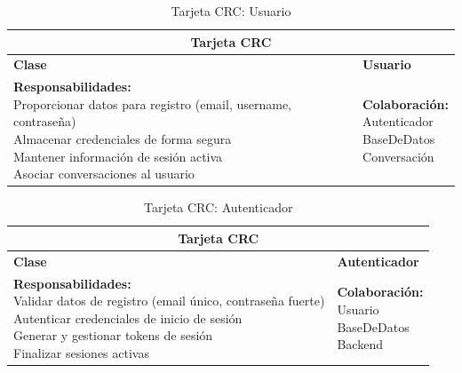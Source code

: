 \begin{addendum}
		\begin{longtable}{|l|l|}
			\caption{Tarjeta CRC: Usuario} \label{tablacrc6} \\
			\hline
			\multicolumn{2}{|c|}{\textbf{Tarjeta CRC}} \\
			\hline
			\textbf{Clase} & \textbf{Usuario} \\
			\hline
			\parbox[t]{0.45\linewidth}{\textbf{Responsabilidades:} \\ 
				Proporcionar datos para registro (email, username, contraseña) \\ 
				Almacenar credenciales de forma segura \\ 
				Mantener información de sesión activa \\ 
				Asociar conversaciones al usuario} 
			& 
			\parbox[t]{0.45\linewidth}{\textbf{Colaboración:} \\ 
				Autenticador \\ 
				BaseDeDatos \\ 
				Conversación} \\
			\hline
		\end{longtable}
		
		\begin{longtable}{|l|l|}
			\caption{Tarjeta CRC: Autenticador} \label{tablacrc7} \\
			\hline
			\multicolumn{2}{|c|}{\textbf{Tarjeta CRC}} \\
			\hline
			\textbf{Clase} & \textbf{Autenticador} \\
			\hline
			\parbox[t]{0.45\linewidth}{\textbf{Responsabilidades:} \\ 
				Validar datos de registro (email único, contraseña fuerte) \\ 
				Autenticar credenciales de inicio de sesión \\ 
				Generar y gestionar tokens de sesión \\ 
				Finalizar sesiones activas} 
			& 
			\parbox[t]{0.45\linewidth}{\textbf{Colaboración:} \\ 
				Usuario \\ 
				BaseDeDatos \\ 
				Backend} \\
			\hline
		\end{longtable}
		

\end{addendum}
